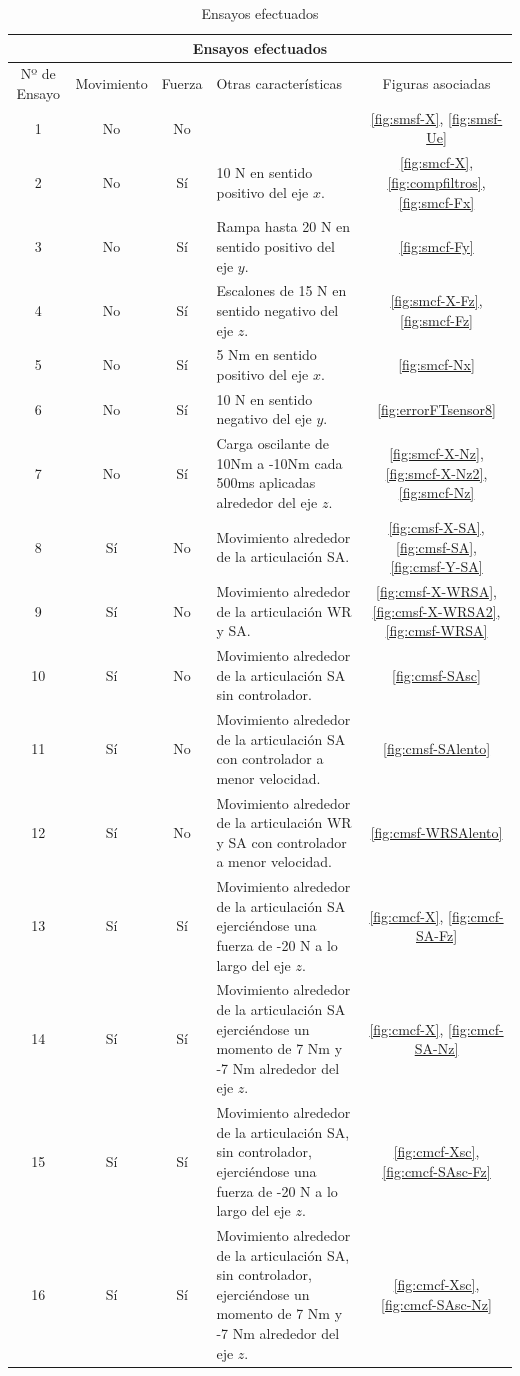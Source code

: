 \begin{table}
\centering
\begin{tabular}[c]{ c c c p{4.75cm} c }
\hline
\multicolumn{5}{c}{Ensayos efectuados} \\
\hline
Nº de Ensayo & Movimiento & Fuerza & Otras características & Figuras asociadas \\
\hline
1 & No & No &   & \ref{fig:smsf-X}, \ref{fig:smsf-Ue}\\
2 & No & Sí & 10 N en sentido positivo del eje $x$\footnotemark[1]. & \ref{fig:smcf-X}, \ref{fig:compfiltros}, \ref{fig:smcf-Fx} \\
3 & No & Sí & Rampa hasta 20 N en sentido positivo del eje $y$\footnotemark[1]. & \ref{fig:smcf-Fy} \\
4 & No & Sí & Escalones de 15 N en sentido negativo del eje $z$\footnotemark[1]. & \ref{fig:smcf-X-Fz}, \ref{fig:smcf-Fz} \\
5 & No & Sí & 5 Nm en sentido positivo del eje $x$\footnotemark[1]. & \ref{fig:smcf-Nx} \\
6 & No & Sí & 10 N en sentido negativo del eje $y$\footnotemark[1]. & \ref{fig:errorFTsensor8} \\
7 & No & Sí & Carga oscilante de 10Nm a -10Nm cada 500ms aplicadas alrededor del eje $z$\footnotemark[1]. & \ref{fig:smcf-X-Nz}, \ref{fig:smcf-X-Nz2}, \ref{fig:smcf-Nz} \\
8 & Sí & No & Movimiento alrededor de la articulación SA. & \ref{fig:cmsf-X-SA}, \ref{fig:cmsf-SA}, \ref{fig:cmsf-Y-SA} \\
9 & Sí & No & Movimiento alrededor de la articulación WR y SA. & \ref{fig:cmsf-X-WRSA}, \ref{fig:cmsf-X-WRSA2}, \ref{fig:cmsf-WRSA} \\
10 & Sí & No & Movimiento alrededor de la articulación SA sin controlador. & \ref{fig:cmsf-SAsc} \\
11 & Sí & No & Movimiento alrededor de la articulación SA con controlador a menor velocidad. & \ref{fig:cmsf-SAlento} \\
12 & Sí & No & Movimiento alrededor de la articulación WR y SA con controlador a menor velocidad. & \ref{fig:cmsf-WRSAlento} \\
13 & Sí & Sí & Movimiento alrededor de la articulación SA ejerciéndose una fuerza de -20 N a lo largo del eje $z$\footnotemark[1]. & \ref{fig:cmcf-X}, \ref{fig:cmcf-SA-Fz} \\
14 & Sí & Sí & Movimiento alrededor de la articulación SA ejerciéndose un momento de 7 Nm y -7 Nm alrededor del eje $z$\footnotemark[1]. & \ref{fig:cmcf-X}, \ref{fig:cmcf-SA-Nz} \\
15 & Sí & Sí & Movimiento alrededor de la articulación SA, sin controlador, ejerciéndose una fuerza de -20 N a lo largo del eje $z$\footnotemark[1]. & \ref{fig:cmcf-Xsc}, \ref{fig:cmcf-SAsc-Fz} \\
16 & Sí & Sí & Movimiento alrededor de la articulación SA, sin controlador, ejerciéndose un momento de 7 Nm y -7 Nm alrededor del eje $z$\footnotemark[1]. & \ref{fig:cmcf-Xsc}, \ref{fig:cmcf-SAsc-Nz} \\
\hline
\end{tabular}
\caption{Ensayos efectuados}
\label{tab:ensayos}
\end{table}

